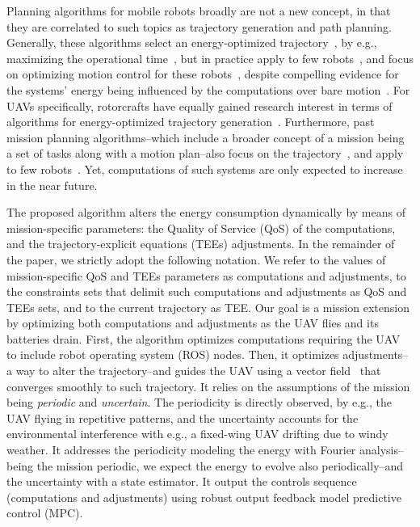 \documentclass[letterpaper,10pt,conference]{ieeeconf}
\theoremstyle{definition}
\begin{document}
Planning algorithms for mobile robots broadly are not a new concept, in that they are correlated to such topics as trajectory generation and path planning. Generally, these algorithms select an energy-optimized trajectory~\cite{mei2004energy}, by e.g., maximizing the operational time~\cite{wahab2015energy}, but in practice apply to few robots~\cite{kim2005energy}, and focus on optimizing motion control for these robots~\cite{kim2008minimum}, despite compelling evidence for the systems' energy being influenced by the computations over bare motion~\cite{mei2005case}. For UAVs specifically, rotorcrafts have equally gained research interest in terms of algorithms for energy-optimized trajectory generation~\cite{morbidi2016minimum,kreciglowa2017energy}. Furthermore, past mission planning algorithms--which include a broader concept of a mission being a set of tasks along with a motion plan--also focus on the trajectory~\cite{mei2005case,mei2006deployment}, and apply to few robots~\cite{sadrpour2013mission,sadrpour2013experimental}. Yet, computations of such systems are only expected to increase in the near future.

The proposed algorithm alters the energy consumption dynamically by means of mission-specific parameters: the Quality of Service (QoS) of the computations, and the trajectory-explicit equations (TEEs) adjustments. In the remainder of the paper, we strictly adopt the following notation.  We refer to the values of mission-specific QoS and TEEs parameters as computations and adjustments, to the constraints sets that delimit such computations and adjustments as QoS and TEEs sets, and to the current trajectory as TEE. Our goal is a mission extension by optimizing both computations and adjustments as the UAV flies and its batteries drain. First, the algorithm optimizes computations requiring the UAV to include robot operating system (ROS) nodes. Then, it optimizes adjustments--a way to alter the trajectory--and guides the UAV using a vector field~\cite{de2017guidance} that converges smoothly to such trajectory. It relies on the assumptions of the mission being \emph{periodic} and \emph{uncertain}. The periodicity is directly observed, by e.g., the UAV flying in repetitive patterns, and the uncertainty accounts for the environmental interference with e.g., a fixed-wing UAV drifting due to windy weather. It addresses the periodicity modeling the energy with Fourier analysis--being the mission periodic, we expect the energy to evolve also periodically--and the uncertainty with a state estimator. It output the controls sequence (computations and adjustments) using robust output feedback model predictive control (MPC).
\end{document}
